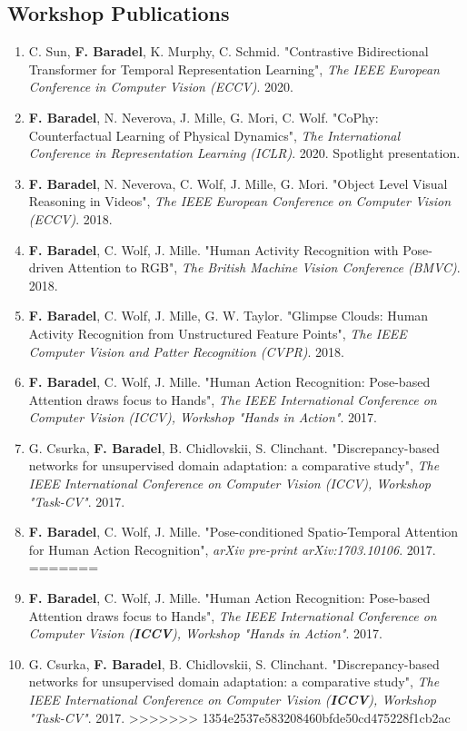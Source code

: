 \documentclass[10pt]{res} %
\begin{document}
\begin{resume}
\section{\large Workshop Publications}
\begin{enumerate}[wide=0pt]
<<<<<<< HEAD
	\item C. Sun, \textbf{F. Baradel}, K. Murphy, C. Schmid. "Contrastive Bidirectional Transformer for Temporal Representation Learning", \textit{The IEEE European Conference in Computer Vision (ECCV)}. 2020.
	\item \textbf{F. Baradel}, N. Neverova, J. Mille, G. Mori, C. Wolf. "CoPhy: Counterfactual Learning of Physical Dynamics", \textit{The International Conference in Representation Learning (ICLR)}. 2020. Spotlight presentation.%
	\item \textbf{F. Baradel}, N. Neverova, C. Wolf, J. Mille, G. Mori. "Object Level Visual Reasoning in Videos", \textit{The IEEE European Conference on Computer Vision (ECCV)}. 2018.%
	\item \textbf{F. Baradel}, C. Wolf, J. Mille. "Human Activity Recognition with Pose-driven Attention to RGB", \textit{The British Machine Vision Conference (BMVC)}. 2018.%
	\item \textbf{F. Baradel}, C. Wolf, J. Mille, G. W. Taylor. "Glimpse Clouds: Human Activity Recognition from Unstructured Feature Points", \textit{The IEEE Computer Vision and Patter Recognition (CVPR)}. 2018.%
	\item \textbf{F. Baradel}, C. Wolf, J. Mille. "Human Action Recognition: Pose-based Attention draws focus to Hands", \textit{The IEEE International Conference on Computer Vision (ICCV), Workshop "Hands in Action"}. 2017.%
	\item G. Csurka, \textbf{F. Baradel}, B. Chidlovskii, S. Clinchant. "Discrepancy-based networks for unsupervised domain adaptation: a comparative study",  \textit{The IEEE International Conference on Computer Vision (ICCV), Workshop "Task-CV"}. 2017.%
	\item \textbf{F. Baradel}, C. Wolf, J. Mille. "Pose-conditioned Spatio-Temporal Attention for Human Action Recognition",  \textit{arXiv pre-print arXiv:1703.10106}. 2017.%
=======
	\item \textbf{F. Baradel}, C. Wolf, J. Mille. "Human Action Recognition: Pose-based Attention draws focus to Hands", \textit{The IEEE International Conference on Computer Vision (\textbf{ICCV}), Workshop "Hands in Action"}. 2017.
	\item G. Csurka, \textbf{F. Baradel}, B. Chidlovskii, S. Clinchant. "Discrepancy-based networks for unsupervised domain adaptation: a comparative study",  \textit{The IEEE International Conference on Computer Vision (\textbf{ICCV}), Workshop "Task-CV"}. 2017.
>>>>>>> 1354e2537e583208460bfde50cd475228f1cb2ac
\end{enumerate}


\end{resume}
\end{document}
